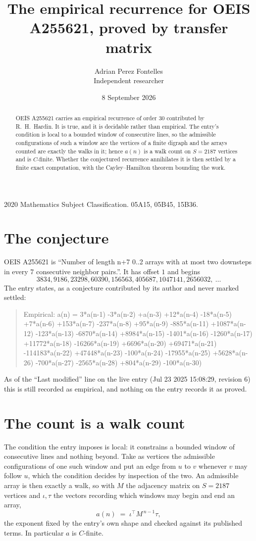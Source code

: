 \documentclass[11pt,a4paper]{article}
\title{The empirical recurrence for OEIS A255621, proved by transfer matrix}
\author{Adrian Perez Fontelles\\ \small Independent researcher}
\date{8 September 2026}
\theoremstyle{plain}
\theoremstyle{definition}
\begin{document}
\maketitle

\begin{abstract}
OEIS A255621 carries an empirical recurrence of order $30$ contributed by R.~H.~Hardin. It is
true, and it is decidable rather than empirical. The entry's condition is local to a bounded window of consecutive lines, so
the admissible configurations of such a window are the vertices of a finite digraph and the
arrays counted are exactly the walks in it; hence $a(n)$ is a walk count on $S=2187$ vertices
and is $C$-finite. Whether the conjectured recurrence annihilates it is then settled by a
finite exact computation, with the Cayley--Hamilton theorem bounding the work.
\end{abstract}

\noindent\small 2020 Mathematics Subject Classification. 05A15, 05B45, 15B36.\normalsize

\section{The conjecture}

OEIS A255621 is ``Number of length n+7 0..2 arrays with at most two downsteps in every 7 consecutive neighbor pairs.''. It has offset $1$ and begins
\[
3834, 9186, 23298, 60390, 156563, 405687, 1047141, 2656032,\ \dots
\]
The entry states, as a conjecture contributed by its author and never marked settled:
\begin{quote}
Empirical: a(n) = 3*a(n-1) -3*a(n-2) +a(n-3) +12*a(n-4) -18*a(n-5) +7*a(n-6) +153*a(n-7) -237*a(n-8) +95*a(n-9) -885*a(n-11) +1087*a(n-12) -123*a(n-13) -6870*a(n-14) +8984*a(n-15) -1401*a(n-16) -1260*a(n-17) +11772*a(n-18) -16266*a(n-19) +6696*a(n-20) +69471*a(n-21) -114183*a(n-22) +47448*a(n-23) -100*a(n-24) -17955*a(n-25) +5628*a(n-26) -700*a(n-27) -2565*a(n-28) +804*a(n-29) -100*a(n-30)
\end{quote}
As of the ``Last modified'' line on the live entry (Jul 23 2025 15:08:29, revision 6) this is still
recorded as empirical, and nothing on the entry records it as proved.

\section{The count is a walk count}

The condition the entry imposes is local: it constrains a bounded window of consecutive lines and nothing beyond. Take as
vertices the admissible configurations of one such window and put an edge from $u$ to $v$
whenever $v$ may follow $u$, which the condition decides by inspection of the two. An
admissible array is then exactly a walk, so with $M$ the adjacency matrix on $S=2187$ vertices
and $\iota,\tau$ the vectors recording which windows may begin and end an array,
\[
a(n)\;=\;\iota^{\!\top}M^{\,n-1}\tau ,
\]
the exponent fixed by the entry's own shape and checked against its published terms. In
particular $a$ is $C$-finite.
\end{document}
